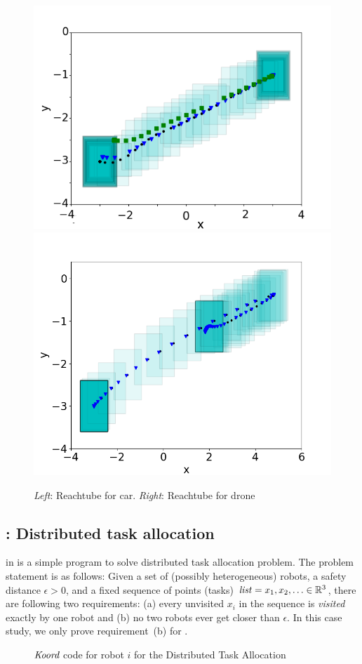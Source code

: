 \begin{figure}[!h]
    \includegraphics[width=0.4\linewidth]{figs/car_trajs.png}
    \includegraphics[width=0.4\linewidth]{figs/drone_trajs.png}
    \caption{\emph{Left}: Reachtube for car. \emph{Right}: Reachtube for drone}\label{fig:dryvr}
\end{figure}

\subsection{\Task: Distributed task allocation}

\newcommand{\ds}{\ensuremath{\epsilon}\xspace}

\Task in  is a simple \lgname program to solve distributed task allocation problem.
The problem statement is as follows:
Given a set of (possibly heterogeneous) robots, a safety distance $\ds>0$,
and a fixed sequence of points (tasks) $\mathit{list} = x_1, x_2, \ldots \in \reals^3$,
there are following two requirements:
(a) every unvisited $x_i$ in the sequence is {\em visited\/} exactly by one robot and
(b) no two robots ever get closer than \ds.
In this case study, we only prove requirement~(b) for \Task.

\begin{figure}[t]

    \begin{mdframed}{%
    {
        
    }
    {
        
    }}\end{mdframed}
    \caption{ $\emph{Koord}$ code for robot $i$ for the Distributed Task Allocation}
    \label{fig:taskapp}
\end{figure}

